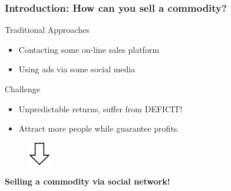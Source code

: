 \documentclass{beamer}
\begin{document}
\begin{frame}
\frametitle{Introduction: How can you sell a commodity?}


\begin{block}{Traditional Approaches}
\begin{itemize}
\item Contacting some on-line sales platform
\item Using ads via some social media 
\end{itemize}
\end{block}
\begin{alertblock}{Challenge}
\begin{itemize}
\item \alert{Unpredictable} returns, suffer from \alert{DEFICIT}!
\item Attract more people while guarantee  profits.
\end{itemize}
\end{alertblock}
\begin{figure}
\centering
\includegraphics[height=1cm]{downarrow.pdf}
\end{figure}
\begin{center}
\Large{\textbf{Selling a commodity via social network!}}
\end{center}
\end{frame}

\end{document}
